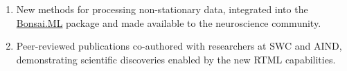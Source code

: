 
\begin{enumerate}
    \item New methods for processing non-stationary data, integrated into the \href{https://bonsai-rx.org/machinelearning/}{Bonsai.ML} package and made available to the neuroscience community.
    \item Peer-reviewed publications co-authored with researchers at SWC and AIND, demonstrating scientific discoveries enabled by the new RTML capabilities.
\end{enumerate}


